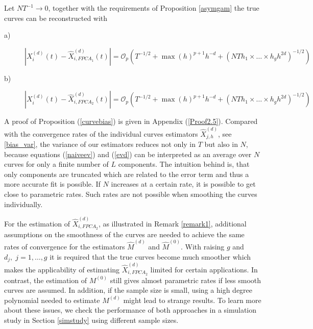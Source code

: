 \begin{proposition}
\label{curvebias}
Let $N T^{-1} \rightarrow 0$, together with the requirements of Proposition \ref{asymgam} the true curves can be reconstructed with 
\begin{description}
 \item[a)] $|X^{(d)}_{i}(t) - \hat{X}^{(d)}_{i,FPCA_1}(t)| =  \mathcal{O}_p\left(T^{-1/2}+ \max(h)^{p+1} h^{-d} +(N T h_1 \times \dots \times h_g  h^{2d} )^{-1/2} \right)$%
 \item[b)]$|X^{(d)}_{i}(t) - \hat{X}^{(d)}_{i,FPCA_2}(t)| = \mathcal{O}_p\left(T^{-1/2}+ \max(h)^{p+1} h^{-d}+(N T h_1 \times \dots \times h_g  h^{2d} )^{-1/2} \right)$%
\end{description}
\end{proposition}
A proof of Proposition (\ref{curvebias}) is given in Appendix (\ref{Proof2.5}).
Compared with the convergence rates of the individual curves estimators $\hat{X}^{(d)}_{j,h}$, see \eqref{bias_var}, the variance of our estimators reduces not only in $T$ but also in $N$, because equations (\ref{naiveev}) and (\ref{evd}) can be interpreted as an average over $N$ curves for only a finite number of $L$ components. The intuition behind is, that only  components are truncated which are related to the error term and thus a more accurate fit is possible. If $N$ increases at a certain rate, it is possible to get close to parametric rates. Such rates are not possible when smoothing the curves individually.
 
For the estimation of $\hat{X}^{(d)}_{i,FPCA_2}$,  as illustrated in Remark \ref{remark1}, additional assumptions on the smoothness of the curves are needed to achieve the same rates of convergence for the estimators $\hat{M}^{(d)}$ and $\hat{M}^{(0)}$. %
With raising $g$ and $d_j, \; j=1,\dots,g$ it is required that the true  curves become much smoother which makes the  applicability of estimating $\hat{X}^{(d)}_{i,FPCA_2}$ limited for certain applications. In contrast, the estimation of $M^{(0)}$ still gives almost parametric rates if less smooth curves are assumed. %
In addition, if the sample size is small, using a high degree polynomial needed to estimate $M^{(d)}$ might lead to strange results. To learn more about these issues, we check the performance of both approaches in a simulation study in Section \ref{simstudy} using different sample sizes.
